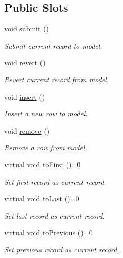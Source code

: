 \subsection*{Public Slots}
\begin{DoxyCompactItemize}
\item 
void \hyperlink{classmdt_abstract_sql_widget_a6678c45b0d46eb163f5b09d79ed001b5}{submit} ()
\begin{DoxyCompactList}\small\item\em Submit current record to model. \end{DoxyCompactList}\item 
void \hyperlink{classmdt_abstract_sql_widget_a3108b336f4c832cb0a5b3a830fff9ce0}{revert} ()
\begin{DoxyCompactList}\small\item\em Revert current record from model. \end{DoxyCompactList}\item 
void \hyperlink{classmdt_abstract_sql_widget_a850df045ea95b8c15ddd95ae771ef785}{insert} ()
\begin{DoxyCompactList}\small\item\em Insert a new row to model. \end{DoxyCompactList}\item 
void \hyperlink{classmdt_abstract_sql_widget_a748f85ff383d3f11fda4db7f931edb1c}{remove} ()
\begin{DoxyCompactList}\small\item\em Remove a row from model. \end{DoxyCompactList}\item 
virtual void \hyperlink{classmdt_abstract_sql_widget_aaa27731864dbb9123ec6765dd21feb7f}{to\-First} ()=0
\begin{DoxyCompactList}\small\item\em Set first record as current record. \end{DoxyCompactList}\item 
virtual void \hyperlink{classmdt_abstract_sql_widget_a681cc6234976eaa2f0e158248569b502}{to\-Last} ()=0
\begin{DoxyCompactList}\small\item\em Set last record as current record. \end{DoxyCompactList}\item 
virtual void \hyperlink{classmdt_abstract_sql_widget_a342b13a8258536d228f8522dae2b9df7}{to\-Previous} ()=0
\begin{DoxyCompactList}\small\item\em Set previous record as current record. \end{DoxyCompactList}\item 

\end{DoxyCompactItemize}
